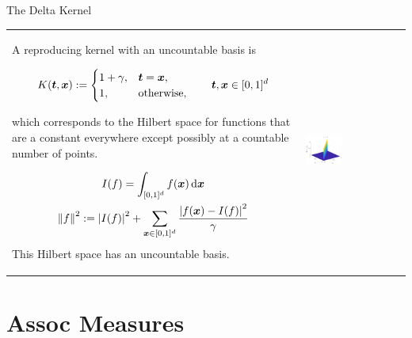 \documentclass[10pt,compress,xcolor={usenames,dvipsnames},aspectratio=169]{beamer}
\begin{document}
\begin{frame}{The Delta Kernel}
	\vspace{-2ex}
	\begin{tabular}{m{}m{}}
		A reproducing kernel with an uncountable basis is 
		
		\vspace{-4ex}
		\begin{equation*}
			K(\boldsymbol{t},\boldsymbol{x}) : = \begin{cases} 1 + \gamma, & \boldsymbol{t} = \boldsymbol{x}, \\ 1, & \text{otherwise}, \end{cases}
			\qquad \boldsymbol{t}, \boldsymbol{x} \in [0,1]^d
		\end{equation*}
		
		\vspace{-2ex}
		which corresponds to the Hilbert space for functions that are a constant everywhere except possibly at a countable number of points.
		
		\vspace{-4ex}
		\begin{gather*}
			I(f) = \int_{[0,1]^d} f(\boldsymbol{x}) \, {\rm d} \boldsymbol{x} \\
		    \left \lVert f \right \rVert_{{}}^2 : = \left \lvert I(f) \right \rvert^2 + \sum_{\boldsymbol{x} \in [0,1]^d} \frac{\left \lvert f(\boldsymbol{x}) - I(f) \right \rvert^2}{\gamma}
		\end{gather*}
	This Hilbert space has an uncountable basis.
		&
		\includegraphics[width=0.38\textwidth]{RK-deltaker.eps}
	\end{tabular}
\end{frame}





\section{Assoc Measures}
\end{document}
